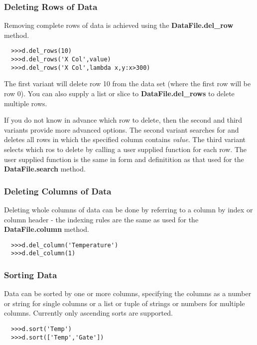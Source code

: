 \documentclass[a4paper,11pt]{scrartcl}
\begin{document}
\subsubsection{Deleting Rows of Data}

Removing complete rows of data is achieved using the \textbf{DataFile.del\_row}
method.

\begin{verbatim}
  >>>d.del_rows(10)
  >>>d.del_rows('X Col',value)
  >>>d.del_rows('X Col',lambda x,y:x>300)
\end{verbatim}

The first variant will delete row 10 from the data set (where the first row will
be row 0). You can also supply a list or slice to \textbf{DataFile.del\_rows} to
delete multiple rows.

If you do not know in advance which row to delete, then the second and third
variants provide more advanced options. The second variant searches for and
deletes all rows in which the specified column contains \textit{value}. The
third variant selects which ros to delete by calling a user supplied function
for each row. The user supplied function is the same in form and definitition as
that used for the \textbf{DataFile.search} method.

\subsubsection{Deleting Columns of Data}

Deleting whole columns of data can be done by referring to a column by index or
column header - the indexing rules are the same as used for the
\textbf{DataFile.column} method.

\begin{verbatim}
  >>>d.del_column('Temperature')
  >>>d.del_column(1)
\end{verbatim}

\subsubsection{Sorting Data}

Data can be sorted by one or more columns, specifying the columns as a number or
string for single columns or a list or tuple of strings or numbers for multiple
columns. Currently only ascending sorts are supported.

\begin{verbatim}
  >>>d.sort('Temp')
  >>>d.sort(['Temp','Gate'])
\end{verbatim}
\end{document}
